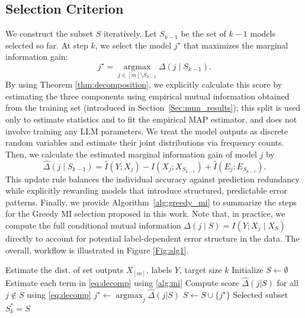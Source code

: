 \documentclass{article}
\theoremstyle{plain}
\theoremstyle{definition}
\theoremstyle{remark}
\begin{document}
\subsection{Selection Criterion}
We construct the subset $S$ iteratively. Let $S_{k\!-\!1}$ be the set of $k\!-\!1\!$ models selected so far. At step $k$, we select the model $j^\star$ that maximizes the marginal information gain:
\begin{equation}
    j^\star = \operatorname*{argmax}_{j \in [m] \setminus S_{k-1}} \Delta(j \mid S_{k
    -1}).
\end{equation}
By using Theorem \ref{thm:decomposition}, we explicitly calculate this score by estimating the three components using empirical mutual information obtained from the training set (introduced in Section~\ref{Sec:num_results}); this split is used only to estimate statistics and to fit the empirical MAP estimator, and does not involve training any LLM parameters. We treat the model outputs as discrete random variables and estimate their joint distributions via frequency counts. Then, we calculate the estimated marginal information gain of model $j$ by 
\begin{equation}\label{eqn:mut_inf_est}
    \!\hat{\Delta}(j \!\mid\! S_{k
    \!-\!1}) \!=\! \hat{I}(Y; X_j) \!-\! \hat{I}(X_j; X_{S_{k\!-\!1}}) \!+\! \hat{I}(E_j; E_{S_{k\!-\!1}}).\!\!
\end{equation}
This update rule balances the individual accuracy against prediction redundancy while explicitly rewarding models that introduce structured, predictable error patterns. Finally, we provide Algorithm~\ref{alg:greedy_mi} to summarize the steps for the Greedy MI selection proposed in this work. Note that, in practice, we compute the full conditional mutual information $\Delta(j \mid S) = I(Y; X_j \mid X_S)$ directly to account for potential label-dependent error structure in the data. The overall, workflow is illustrated in Figure \ref{Fig:alg1}.

\begin{algorithm}[tb]
  \caption{Greedy MI Selection}
  \label{alg:greedy_mi}
  \begin{algorithmic}
     Estimate the dist. of set outputs $X_{[m]}$, labels $Y$, target size $k$
    \STATE Initialize $S \leftarrow \emptyset$
      \STATE Estimate each term in \cref{eq:decomp} using \cref{alg:mi}
      \STATE Compute score $\hat{\Delta}(j|S)$ for all $j \notin S$ using \eqref{eq:decomp}
      \STATE $j^\star \leftarrow \operatorname{argmax}_{j} \hat{\Delta}(j|S)$
      \STATE $S \leftarrow S \cup \{j^\star\}$
    \ENDFOR
     Selected subset $S_k^*=S$
  \end{algorithmic}
\end{algorithm}
\end{document}
